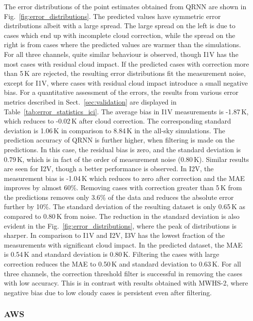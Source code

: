 \documentclass[amt, manuscript]{copernicus}
\begin{document}
The error distributions of the point estimates obtained from QRNN are shown in Fig.~\ref{fig:error_distributions}. The predicted values have symmetric error distributions albeit with a large spread. The large spread on the left is due to cases which end up with incomplete cloud correction, while the spread on the right is from cases where the predicted values are warmer than the simulations. For all three channels, quite similar behaviour is observed, though I1V has the most cases with residual cloud impact. If the predicted cases with correction more than 5\,K are rejected, the resulting error distributions fit the measurement noise, except for I1V, where cases with residual cloud impact introduce a small negative bias. For a quantitative assessment of the errors, the results from various error metrics described in  Sect.~\ref{sec:validation} are displayed in Table~\ref{tab:error_statistics_ici}. The average bias in I1V measurements is -1.87\,K, which reduces to -0.02\,K after cloud correction. The corresponding standard deviation is 1.06\,K in comparison to 8.84\,K in the all-sky simulations. The prediction accuracy of QRNN is further higher, when filtering is made on the predictions. In this case, the residual bias is zero, and the standard deviation is 0.79\,K, which is in fact of the order of measurement noise (0.80\,K). Similar results are seen for I2V, though a better performance is observed. In I2V, the measurement bias is -1.04\,K which reduces to zero after correction and the MAE improves by almost 60\%. Removing cases with correction greater than 5\,K from the predictions removes only 3.6\% of the data and reduces the absolute error further by 10\%. The standard deviation of the resulting dataset is only 0.65\,K as compared to 0.80\,K from noise. The reduction in the standard deviation is also evident in the Fig.~\ref{fig:error_distributions}, where the peak of distributions is sharper. In comparison to I1V and I2V, I3V has the lowest fraction of the measurements with significant cloud impact. In the predicted dataset, the MAE is 0.54\,K  and standard deviation is 0.80\,K. Filtering the cases with large correction reduces the MAE to 0.50\,K and standard deviation to 0.63\,K.  For all three channels, the correction threshold filter is successful in removing the cases with low accuracy. This is in contrast with results obtained with MWHS-2, where negative bias due to low cloudy cases is persistent even after filtering. 


\subsubsection{AWS}
\end{document}
